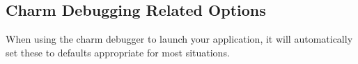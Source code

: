 \documentclass[10pt]{article}
\begin{document}







\subsection{Charm Debugging Related Options}

When using the charm debugger to launch your application, it will automatically
set these to defaults appropriate for most situations.
\end{document}
